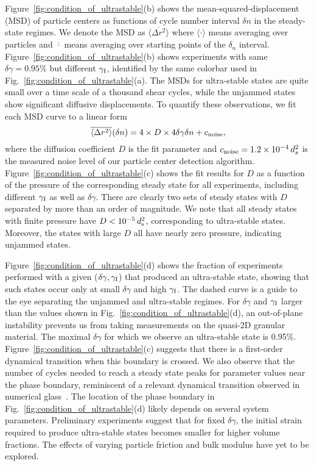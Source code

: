 \documentclass[twocolumn,showkeys,superscriptaddress,preprintnumbers,amsmath,amssymb,showpacs,prx,longbibliography]{revtex4-2}
\begin{document}
\begin{CJK*}{UTF8}{gbsn}
Figure~\ref{fig:condition_of_ultrastable}(b) shows the mean-squared-displacement (MSD) of particle centers as functions of cycle number interval $\delta n$ in the steady-state regimes. We denote the MSD as $\overline{\langle \Delta r^2\rangle}$ where $\langle\cdot\rangle$ means averaging over particles and $\overline{\cdot}$ means averaging over starting points of the $\delta_n$ interval.  Figure~\ref{fig:condition_of_ultrastable}(b) shows experiments with same $\delta\gamma=0.95\%$ but different $\gamma_{\rm I}$, identified by the same colorbar used in Fig.~\ref{fig:condition_of_ultrastable}(a). The MSDs for ultra-stable states are quite small over a time scale of a thousand shear cycles, while the unjammed states show significant diffusive displacements. To quantify these observations, we fit each MSD curve to a linear form
\begin{equation}\label{eq:msd_fit}
    \overline{\langle\Delta r^2\rangle}(\delta n) = 4\times D\times4\delta\gamma\delta n + c_{\rm noise},
\end{equation}
where the diffusion coefficient $D$ is the fit parameter and $c_{\rm noise} = 1.2\times 10^{-4}\,d_s^2$ is the measured noise level of our particle center detection algorithm. Figure~\ref{fig:condition_of_ultrastable}(c) shows the fit results for $D$ as a function of the pressure of the corresponding steady state for all experiments, including different $\gamma_{\rm I}$ as well as  $\delta\gamma$. There are clearly two sets of steady states with $D$ separated by more than an order of magnitude. We note that all steady states with finite pressure have $D<10^{-5}\,d_{\rm s}^2$, corresponding to ultra-stable states. Moreover, the states with large $D$ all have nearly zero pressure, indicating unjammed states.

Figure~\ref{fig:condition_of_ultrastable}(d) shows the fraction of experiments performed with a given  ($\delta\gamma,\gamma_{\rm I}$) that produced an ultra-stable state, showing that such states occur only at small $\delta\gamma$ and high $\gamma_{\rm I}$. The dashed curve is a guide to the eye separating the unjammed and ultra-stable regimes. For $\delta\gamma$ and $\gamma_{\rm I}$ larger than the values shown in Fig.~\ref{fig:condition_of_ultrastable}(d), an out-of-plane instability prevents us from taking measurements on the quasi-2D granular material. The maximal $\delta\gamma$ for which we observe an ultra-stable state is 0.95\%. Figure~\ref{fig:condition_of_ultrastable}(c) suggests that there is a first-order dynamical transition when this boundary is crossed. {\color{black} We also observe that the number of cycles needed to reach a steady state peaks for parameter values near the phase boundary, reminiscent of a relevant dynamical transition observed in numerical glass~\cite{kawasaki2016_pre}.}
The location of the phase boundary in Fig.~\ref{fig:condition_of_ultrastable}(d) likely depends on several system parameters. Preliminary experiments suggest that for fixed $\delta\gamma$,  the initial strain required to produce ultra-stable states becomes smaller for higher volume fractions.  The effects of varying particle friction and bulk modulus have yet to be explored. 




\end{CJK*}
\end{document}
